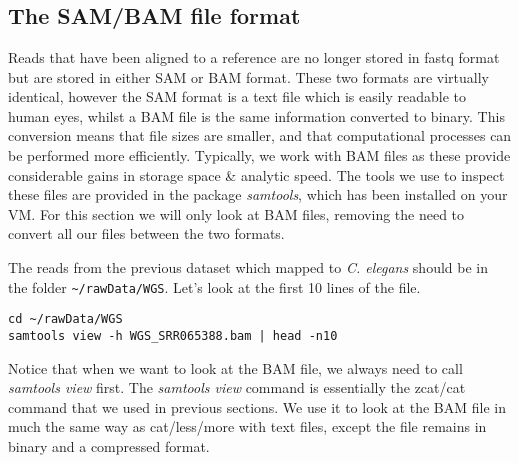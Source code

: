 
\chapter{\moduleTitle}
\newpage

\section{The SAM/BAM file format}
\begin{information}
Reads that have been aligned to a reference are no longer stored in fastq format but are stored in either SAM or BAM format.
These two formats are virtually identical, however the SAM format is a text file which is easily readable to human eyes, whilst a BAM file is the same information converted to binary.
This conversion means that file sizes are smaller, and that computational processes can be performed more efficiently.
Typically, we work with BAM files as these provide considerable gains in storage space \& analytic speed.
The tools we use to inspect these files are provided in the package \textit{samtools}, which has been installed on your VM.
For this section we will only look at BAM files, removing the need to convert all our files between the two formats. \\
\end{information}

\begin{steps}
The reads from the previous dataset which mapped to \textit{C. elegans} should be in the folder \texttt{\~{}/rawData/WGS}.
Let's look at the first 10 lines of the file.
\begin{lstlisting}
cd ~/rawData/WGS
samtools view -h WGS_SRR065388.bam | head -n10
\end{lstlisting}
\end{steps}

\begin{note}
Notice that when we want to look at the BAM file, we always need to call \textit{samtools view} first.
The \textit{samtools view} command is essentially the zcat/cat command that we used in previous sections.
We use it to look at the BAM file in much the same way as cat/less/more with text files, except the file remains in binary and a compressed format.
\end{note}

